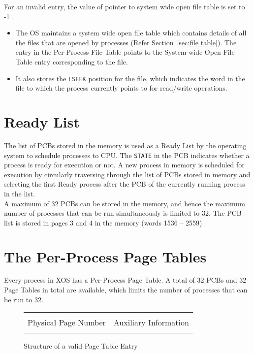 \documentclass[10pt]{report}
\begin{document}
	For an invalid entry, the value of pointer to system wide open file table is set to -1 .
\begin{itemize}

\item
The OS maintains a system wide open file table which contains details of all the files that are opened by processes (Refer Section~\ref{sec:file table}). The entry in the Per-Process File Table points to the System-wide Open File Table entry corresponding to the file. 
\item It also stores the \texttt{LSEEK} position for the file, which indicates the word in the file to which the process currently points to for read/write operations. 
\end{itemize}




\section{Ready List}
\label{sec:readylist}

The list of PCBs stored in the memory is used as a Ready List by the operating system to schedule processes to CPU. The \texttt{STATE} in the PCB indicates whether a process is ready for execution or not.  A new process in memory is scheduled for execution by circularly traversing through the list of PCBs stored in memory and selecting the first Ready process after the PCB of the currently running process in the list.\\

A maximum of 32 PCBs can be stored in the memory, and hence the maximum number of processes that can be run simultaneously is limited to 32. The PCB list is stored in pages 3 and 4 in the memory (words 1536 -- 2559)

\section{The Per-Process Page Tables}
\label{sec:pagetable}
Every process in XOS has a Per-Process Page Table. A total of 32 PCBs and 32 Page Tables in total are available, which limits the number of processes that can be run to 32. \\

		\begin{figure}[htp!]
		\centering
		\begin{tabular}{|c|c|}
		\hline
		  	 	& 			\\ 
		 	Physical Page Number & Auxiliary Information  \\
			 	& 			\\  \hline
		\end{tabular}
		\caption{Structure of a valid Page Table Entry}
		\label{fig:pagetable}
	\end{figure}
\end{document}
